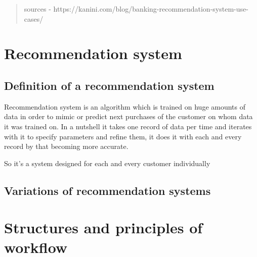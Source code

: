 \documentclass[10pt,twoside,english,a4paper]{article}
\begin{document}
\begin{abstract}
\begin{itemize}
\begin{itemize}
    \end{itemize}
    

\end{itemize}

sources - https://kanini.com/blog/banking-recommendation-system-use-cases/

\end{abstract}


\tableofcontents

\section{Recommendation system}

\subsection{Definition of a recommendation system}
Recommendation system is an algorithm which is trained on huge amounts of data in order to mimic or predict next purchases of the customer on whom data it was trained on.
In a nutshell it takes one record of data per time and iterates with it to specify parameters and refine them, it does it with each and every record by that becoming more accurate.

So it's a system designed for each and every customer individually

\subsection{Variations of recommendation systems}


\section{Structures and principles of workflow}
\end{document}
